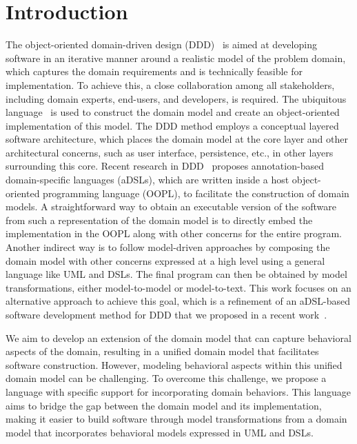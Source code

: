 \section{Introduction}
\label{sect:introduction}

The object-oriented domain-driven design (DDD)~\cite{evans_domain-driven_2004} is aimed at developing software in an iterative manner around a realistic model of the problem domain, which captures the domain requirements and is technically feasible for implementation. To achieve this, a close collaboration among all stakeholders, including domain experts, end-users, and developers, is required. The ubiquitous language~\cite{evans_domain-driven_2004} is used to construct the domain model and create an object-oriented implementation of this model. The DDD method employs a conceptual layered software architecture, which places the domain model at the core layer and other architectural concerns, such as user interface, persistence, etc., in other layers surrounding this core.
%
Recent research in DDD~\cite{dan_haywood_apache_2013, paniza_learn_2011} proposes annotation-based domain-specific languages (aDSLs), which are written inside a host object-oriented programming language (OOPL), to facilitate the construction of domain models. A straightforward way to obtain an executable version of the software from such a representation of the domain model is to directly embed the implementation in the OOPL along with other concerns for the entire program. Another indirect way is to follow model-driven approaches by composing the domain model with other concerns expressed at a high level using a general language like UML and DSLs. The final program can then be obtained by model transformations, either model-to-model or model-to-text. This work focuses on an alternative approach to achieve this goal, which is a refinement of an aDSL-based software development method for DDD that we proposed in a recent work~\cite{le_domain_2018}.

We aim to develop an extension of the domain model that can capture behavioral aspects of the domain, resulting in a unified domain model that facilitates software construction. However, modeling behavioral aspects within this unified domain model can be challenging. To overcome this challenge, we propose a language with specific support for incorporating domain behaviors. This language aims to bridge the gap between the domain model and its implementation, making it easier to build software through model transformations from a domain model that incorporates behavioral models expressed in UML and DSLs.

